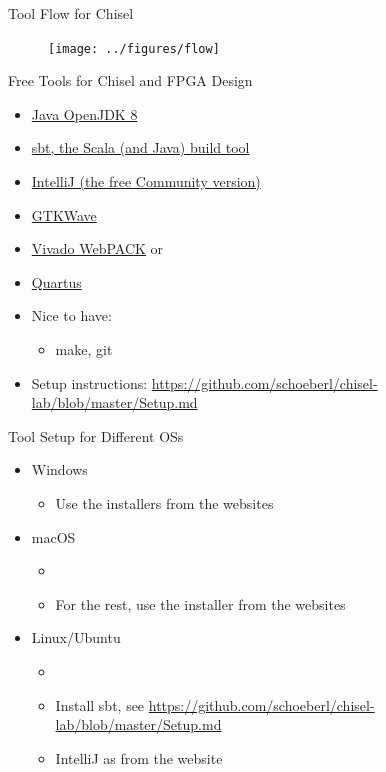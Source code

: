 %

\begin{frame}[fragile]{Tool Flow for Chisel}
\begin{figure}
    \centering
    \texttt{[image: ../figures/flow]}
\end{figure}
\end{frame}

\begin{frame}[fragile]{Free Tools for Chisel and FPGA Design}
\begin{itemize}
\item \href{https://adoptopenjdk.net/}{Java OpenJDK 8}
\item \href{https://www.scala-sbt.org/}{sbt, the Scala (and Java) build tool}
\item \href{https://www.jetbrains.com/idea/download/}{IntelliJ (the free Community version)}
\item \href{http://gtkwave.sourceforge.net/}{GTKWave}
\item \href{https://www.xilinx.com/products/design-tools/vivado/vivado-webpack.html}{Vivado WebPACK} or
\item \href{http://www.altera.com/products/software/quartus-ii/web-edition/qts-we-index.html}{Quartus}
\item Nice to have:
\begin{itemize}
\item make, git
\end{itemize}
\item Setup instructions: \url{https://github.com/schoeberl/chisel-lab/blob/master/Setup.md}
\end{itemize}
\end{frame}

\begin{frame}[fragile]{Tool Setup for Different OSs}
\begin{itemize}
\item Windows
\begin{itemize}
\item Use the installers from the websites
\end{itemize}
\item macOS
\begin{itemize}
\item {}
\item For the rest, use the installer from the websites
\end{itemize}
\item Linux/Ubuntu
\begin{itemize}
\item {}
\item Install sbt, see \url{https://github.com/schoeberl/chisel-lab/blob/master/Setup.md}
\item IntelliJ as from the website
\end{itemize}
\end{itemize}
\end{frame}

